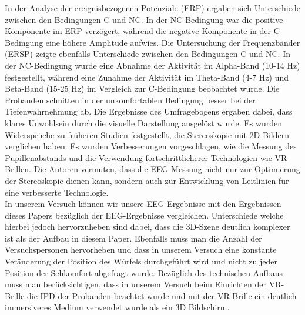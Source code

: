 \documentclass[conference]{IEEEtran}
\begin{document}
In der Analyse der ereignisbezogenen Potenziale (ERP) ergaben sich Unterschiede zwischen den Bedingungen C und NC. In der NC-Bedingung war die positive Komponente im ERP verzögert, während die negative Komponente in der C-Bedingung eine höhere Amplitude aufwies. Die Untersuchung der Frequenzbänder (ERSP) zeigte ebenfalls Unterschiede zwischen den Bedingungen C und NC. In der NC-Bedingung wurde eine Abnahme der Aktivität im Alpha-Band (10-14 Hz) festgestellt, während eine Zunahme der Aktivität im Theta-Band (4-7 Hz) und Beta-Band (15-25 Hz) im Vergleich zur C-Bedingung beobachtet wurde. Die Probanden schnitten in der unkomfortablen Bedingung besser bei der Tiefenwahrnehmung ab. Die Ergebnisse des Umfragebogens ergaben dabei, dass klares Unwohlsein durch die visuelle Darstellung ausgelöst wurde. Es wurden Widersprüche zu früheren Studien festgestellt, die Stereoskopie mit 2D-Bildern verglichen haben. Es wurden Verbesserungen vorgeschlagen, wie die Messung des Pupillenabstands und die Verwendung fortschrittlicherer Technologien wie VR-Brillen. Die Autoren vermuten, dass die EEG-Messung nicht nur zur Optimierung der Stereoskopie dienen kann, sondern auch zur Entwicklung von Leitlinien für eine verbesserte Technologie.\\
In unserem Versuch können wir unsere EEG-Ergebnisse mit den Ergebnissen dieses Papers bezüglich der EEG-Ergebnisse vergleichen. Unterschiede welche hierbei jedoch hervorzuheben sind dabei, dass die 3D-Szene deutlich komplexer ist als der Aufbau in diesem Paper. Ebenfalls muss man die Anzahl der Versuchspersonen hervorheben und dass in unserem Versuch eine konstante Veränderung der Position des Würfels durchgeführt wird und nicht zu jeder Position der Sehkomfort abgefragt wurde. Bezüglich des technischen Aufbaus muss man berücksichtigen, dass in unserem Versuch beim Einrichten der VR-Brille die IPD der Probanden beachtet wurde und mit der VR-Brille ein deutlich immersiveres Medium verwendet wurde als ein 3D Bildschirm.
\end{document}
